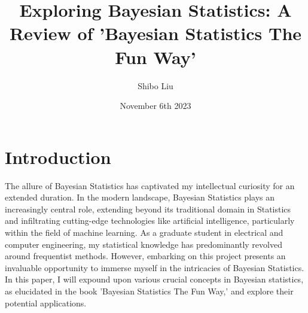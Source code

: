 \documentclass{article}
\title{Exploring Bayesian Statistics: A Review of 'Bayesian Statistics The Fun Way'}
\author{Shibo Liu}
\date{November 6th 2023}
\begin{document}
\maketitle

\section{Introduction}
The allure of Bayesian Statistics has captivated my intellectual curiosity for an extended duration. In the modern landscape, Bayesian Statistics plays an increasingly central role, extending beyond its traditional domain in Statistics and infiltrating cutting-edge technologies like artificial intelligence, particularly within the field of machine learning. As a graduate student in electrical and computer engineering, my statistical knowledge has predominantly revolved around frequentist methods. However, embarking on this project presents an invaluable opportunity to immerse myself in the intricacies of Bayesian Statistics. In this paper, I will expound upon various crucial concepts in Bayesian statistics, as elucidated in the book 'Bayesian Statistics The Fun Way,' and explore their potential applications.
\end{document}
